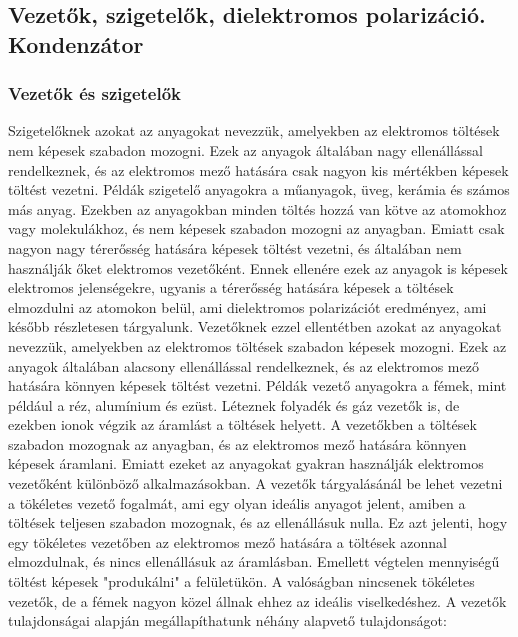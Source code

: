 \documentclass[../main.tex]{subfiles}
\begin{document}
\subsection{Vezetők, szigetelők, dielektromos polarizáció. Kondenzátor}
\subsubsection{Vezetők és szigetelők}
Szigetelőknek azokat az anyagokat nevezzük, amelyekben az elektromos töltések nem képesek szabadon mozogni. Ezek az anyagok általában nagy ellenállással rendelkeznek, és az elektromos mező hatására csak nagyon kis mértékben képesek töltést vezetni. Példák szigetelő anyagokra a műanyagok, üveg, kerámia és számos más anyag.
Ezekben az anyagokban minden töltés hozzá van kötve az atomokhoz vagy molekulákhoz, és nem képesek szabadon mozogni az anyagban. Emiatt csak nagyon nagy térerősség hatására képesek töltést vezetni, és általában nem használják őket elektromos vezetőként. Ennek ellenére ezek
az anyagok is képesek elektromos jelenségekre, ugyanis a térerősség hatására képesek a töltések elmozdulni az atomokon belül, ami dielektromos polarizációt eredményez, ami később részletesen tárgyalunk.
\newline
\newline
Vezetőknek ezzel ellentétben azokat az anyagokat nevezzük, amelyekben az elektromos töltések szabadon képesek mozogni. Ezek az anyagok általában alacsony ellenállással rendelkeznek, és az elektromos mező hatására könnyen képesek töltést vezetni. Példák vezető anyagokra a fémek, mint például a réz, alumínium és ezüst.
Léteznek folyadék és gáz vezetők is, de ezekben ionok végzik az áramlást a töltések helyett. A vezetőkben a töltések szabadon mozognak az anyagban, és az elektromos mező hatására könnyen képesek áramlani. Emiatt ezeket az anyagokat gyakran használják elektromos vezetőként különböző alkalmazásokban.
A vezetők tárgyalásánál be lehet vezetni a tökéletes vezető fogalmát, ami egy olyan ideális anyagot jelent, amiben a töltések teljesen szabadon mozognak, és az ellenállásuk nulla. Ez azt jelenti, hogy egy tökéletes vezetőben az elektromos mező hatására a töltések azonnal elmozdulnak, és nincs ellenállásuk az áramlásban.
Emellett végtelen mennyiségű töltést képesek "produkálni" a felületükön. A valóságban nincsenek tökéletes vezetők, de a fémek nagyon közel állnak ehhez az ideális viselkedéshez.
\newline
\newline
A vezetők tulajdonságai alapján megállapíthatunk néhány alapvető tulajdonságot:
\end{document}
